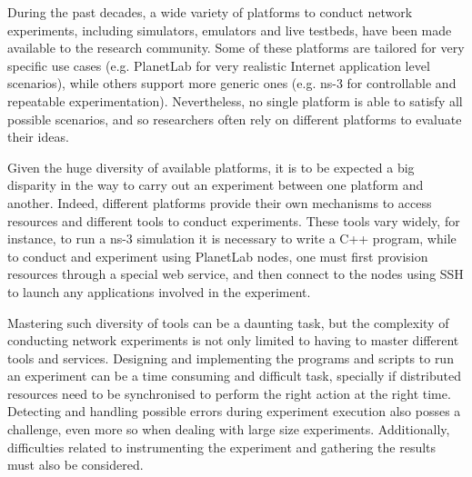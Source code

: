 %
%
%
%
%
%

During the past decades, a wide variety of platforms to conduct network
experiments, including simulators, emulators and live testbeds,
have been made available to the research community.
Some of these platforms are tailored for very specific use cases (e.g.
PlanetLab for very realistic Internet application level scenarios), 
while others support more generic ones (e.g. ns-3 for controllable 
and repeatable experimentation). Nevertheless, no single platform is 
able to satisfy all possible scenarios, and so researchers often rely 
on different platforms to evaluate their ideas.

Given the huge diversity of available platforms, it is to be expected a
big disparity in the way to carry out an experiment between one platform and 
another. Indeed, different platforms provide their own mechanisms to 
access resources and different tools to conduct experiments. 
These tools vary widely, for instance, to run a ns-3 simulation it is 
necessary to write a C++ program, while to conduct and experiment using
PlanetLab nodes, one must first provision resources through a special web
service, and then connect to the nodes using SSH to launch any applications
involved in the experiment.

Mastering such diversity of tools can be a daunting task, 
but the complexity of conducting network experiments is not only limited 
to having to master different tools and services.
Designing and implementing the programs and scripts to run an experiment
can be a time consuming and difficult task, specially if distributed
resources need to be synchronised to perform the right action at the
right time. Detecting and handling possible errors during experiment
execution also posses a challenge, even more so when dealing with large size
experiments. Additionally, difficulties related to instrumenting the 
experiment and gathering the results must also be considered.

